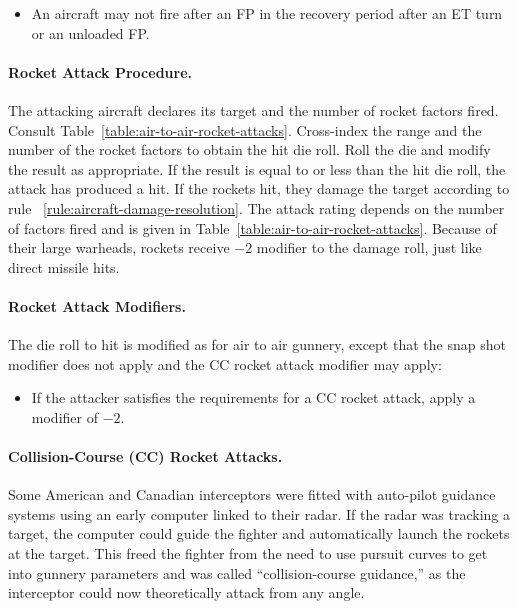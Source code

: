 \begin{advancedrules}
{\begin{itemize}
    \item An aircraft may not fire after an FP in the recovery period after an ET turn or an unloaded FP.

\end{itemize}

\paragraph{Rocket Attack Procedure.} The attacking aircraft declares its target and the number of rocket factors fired. Consult Table~\ref{table:air-to-air-rocket-attacks}. Cross-index the range and the number of the rocket factors to obtain the hit die roll. Roll the die and modify the result as appropriate. If the result is equal to or less than the hit die roll, the attack has produced a hit. If the rockets hit, they damage the target according to rule ~\ref{rule:aircraft-damage-resolution}. The attack rating depends on the number of factors fired and is given in Table~\ref{table:air-to-air-rocket-attacks}. Because of their large warheads, rockets receive $-2$ modifier to the damage roll, just like direct missile hits.

\paragraph{Rocket Attack Modifiers.} 
The die roll to hit is modified as for air to air gunnery, except that the snap shot modifier does not apply and the CC rocket attack modifier may apply:

\begin{itemize}
    \item {} If the attacker satisfies the requirements for a CC rocket attack, apply a modifier of $-2$.
\end{itemize}

\paragraph{Collision-Course (CC) Rocket Attacks.} Some American and Canadian interceptors were fitted with auto-pilot guidance systems using an early computer linked to their radar. If the radar was tracking a target, the computer could guide the fighter and automatically launch the rockets at the target. This freed the fighter from the need to use pursuit curves to get into gunnery parameters and was called “collision-course guidance,” as the interceptor could now theoretically attack from any angle.

}
\end{advancedrules}
